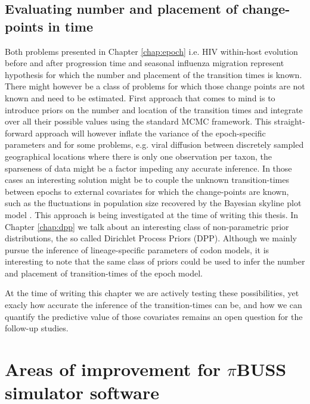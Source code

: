 \subsection{Evaluating number and placement of change-points in time}

Both problems presented in Chapter \ref{chap:epoch} i.e. HIV within-host evolution before and after progression time and seasonal influenza migration represent hypothesis for which the number and placement of the transition times is known.
There might however be a class of problems for which those change points are not known and need to be estimated.
First approach that comes to mind is to introduce priors on the number and location of the transition times and integrate over all their possible values using the standard MCMC framework.
This straight-forward approach will however inflate the variance of the epoch-specific parameters and for some problems, e.g. viral diffusion between discretely sampled geographical locations where there is only one observation per taxon, the sparseness of data might be a factor impeding any accurate inference.
In those cases an interesting solution might be to couple the unknown transition-times between epochs to external covariates for which the change-points are known, such as  the fluctuations in population size recovered by the Bayesian skyline plot model \citep{Drummond2005}.
This approach is being investigated at the time of writing this thesis. %
In Chapter \ref{chap:dpp} we talk about an interesting class of non-parametric prior distributions, the so called Dirichlet Process Priors (DPP). 
Although we mainly pursue the inference of lineage-specific parameters of codon models, it is interesting to note that the same class of priors could be used to infer the number and placement of transition-times of the epoch model.

At the time of writing this chapter we are actively testing these possibilities, yet exacly how accurate the inference of the transition-times can be, and how we can quantify the predictive value of those covariates remains an open question for the follow-up studies.

\section{Areas of improvement for $\pi$BUSS simulator software}

